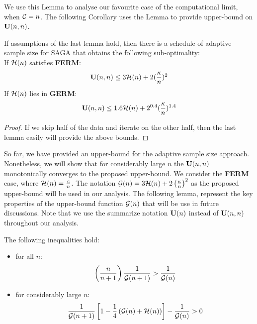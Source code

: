 \documentclass{article}
\begin{document}
We use this Lemma to analyse our favourite case of the computational limit, when
${\cal C} = n$. The following Corollary uses the Lemma to provide upper-bound on
$\mathbf U(n,n)$. 
\begin{corollary}
	If assumptions of the last lemma hold, then there is a schedule of adaptive
	sample size for SAGA that obtains the following sub-optimality: \\ 
	If ${\cal H}(n)$ satisfies \textbf{FERM}:  
	\begin{equation*}
		\mathbf U(n,n) \leq 3 {\cal H}(n) + 2 (\frac{\kappa}{ n})^2
	\end{equation*}
	If ${\cal H}(n)$ lies in \textbf{GERM}: 
	\begin{equation*}
		\mathbf U(n,n) \leq 1.6 {\cal H}(n) + 2^{0.4} (\frac{\kappa}{n})^{1.4}
	\end{equation*}
\end{corollary}	
\begin{proof}
	If we skip half of the data and iterate on the other half, then the
	last lemma easily will provide the above bounds. 
\end{proof}
So far, we have provided an upper-bound for the adaptive sample size approach.
Nonetheless, we will show that for considerably large $n$ the
$\mathbf U(n,n)$ monotonically converges to the proposed upper-bound. We consider the
\textbf{FERM} case, where ${\cal H}(n) = \frac{c}{n}$. The notation ${\cal G}(n)  =  3
{\cal H}(n) + 2 \left(\frac{\kappa}{n}\right)^2$ as the proposed upper-bound will
be used in our analysis. The following lemma, represent the key
properties of the upper-bound function ${\cal G}(n)$ that will be use in future
discussions. Note that we use the summarize notation $\mathbf U(n)$ instead of
$\mathbf U(n,n)$ throughout our analysis.
\begin{lemma} \label{lemma:gn_ineq}
	The following inequalities hold: 
	\begin{itemize}
	  \item for all $n$:
	  \begin{equation*}
		\left( \frac{n}{n+1}\right) \frac{1}{{\cal G}(n+1)}  > 
	\frac{1}{{\cal G}(n)}
	\end{equation*}
	\item for considerably large $n$:
	\begin{equation*}
		\frac{1}{{\cal G}(n+1)}
	\left[1 - \frac{1	}{4} \left( {\cal G}(n) + {\cal H}(n)\right)  \right] - 
	\frac{1}{{\cal G}(n)} > 0
	\end{equation*}
	\end{itemize}
	
\end{lemma}
\end{document}
